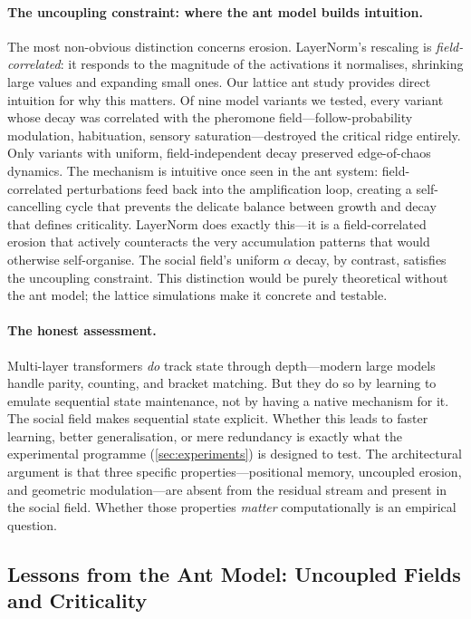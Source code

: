\documentclass[11pt,a4paper]{article}
\newcommand{\retain}{\alpha}
\begin{document}
\paragraph{The uncoupling constraint: where the ant model builds
intuition.}
The most non-obvious distinction concerns erosion.  LayerNorm's
rescaling is \emph{field-correlated}: it responds to the magnitude of
the activations it normalises, shrinking large values and expanding
small ones.  Our lattice ant study provides direct intuition for why
this matters.  Of nine model variants we tested, every variant whose
decay was correlated with the pheromone field---follow-probability
modulation, habituation, sensory saturation---destroyed the critical
ridge entirely.  Only variants with uniform, field-independent decay
preserved edge-of-chaos dynamics.  The mechanism is intuitive once seen
in the ant system: field-correlated perturbations feed back into the
amplification loop, creating a self-cancelling cycle that prevents the
delicate balance between growth and decay that defines criticality.
LayerNorm does exactly this---it is a field-correlated erosion that
actively counteracts the very accumulation patterns that would
otherwise self-organise.  The social field's uniform $\retain$ decay,
by contrast, satisfies the uncoupling constraint.  This distinction
would be purely theoretical without the ant model; the lattice
simulations make it concrete and testable.

\paragraph{The honest assessment.}
Multi-layer transformers \emph{do} track state through depth---modern
large models handle parity, counting, and bracket matching.  But they
do so by learning to emulate sequential state maintenance, not by
having a native mechanism for it.  The social field makes sequential
state explicit.  Whether this leads to faster learning, better
generalisation, or mere redundancy is exactly what the experimental
programme (\cref{sec:experiments}) is designed to test.  The
architectural argument is that three specific properties---positional
memory, uncoupled erosion, and geometric modulation---are absent from
the residual stream and present in the social field.  Whether those
properties \emph{matter} computationally is an empirical question.

\subsection{Lessons from the Ant Model: Uncoupled Fields and Criticality}
\end{document}
